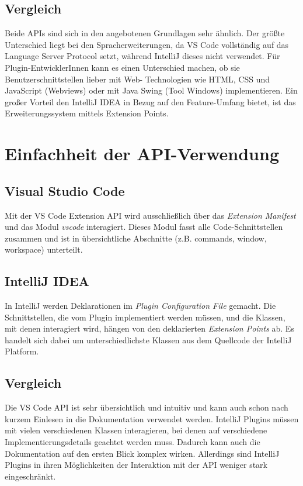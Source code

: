 \subsection{Vergleich}

Beide APIs sind sich in den angebotenen Grundlagen sehr ähnlich.
Der größte Unterschied liegt bei den Spracherweiterungen, da VS Code 
vollständig auf das Language Server Protocol setzt, während IntelliJ
dieses nicht verwendet. Für Plugin-EntwicklerInnen
kann es einen Unterschied machen, ob sie Benutzerschnittstellen
lieber mit Web-\linebreak 
Technologien wie HTML, CSS und JavaScript (Webviews) oder
mit Java Swing (Tool Windows) implementieren. 
Ein großer Vorteil den IntelliJ IDEA in Bezug auf den Feature-Umfang
bietet, ist das Erweiterungssystem mittels Extension Points.


\section{Einfachheit der API-Verwendung}
\label{sec:Vergleich_Intuitivität}

\subsection{Visual Studio Code}

Mit der VS Code Extension API wird ausschließlich
über das \emph{Extension Manifest} und das Modul \emph{vscode} interagiert.
Dieses Modul fasst alle Code-Schnittstellen zusammen und ist
in übersichtliche Abschnitte (z.B. commands, window, workspace) unterteilt.

\subsection{IntelliJ IDEA}

In IntelliJ werden Deklarationen im \emph{Plugin Configuration File} gemacht.
Die Schnittstellen, die vom Plugin implementiert werden müssen, und
die Klassen, mit denen interagiert wird, hängen von den deklarierten
\emph{Extension Points} ab. Es handelt sich dabei um unterschiedlichste
Klassen aus dem Quellcode der IntelliJ Platform.

\subsection{Vergleich}

Die VS Code API ist sehr übersichtlich und intuitiv und kann auch
schon nach kurzem Einlesen in die Dokumentation verwendet werden.
IntelliJ Plugins müssen mit vielen verschiedenen Klassen interagieren,
bei denen auf verschiedene Implementierungsdetails geachtet werden muss.
Dadurch kann auch die Dokumentation auf den ersten Blick komplex
wirken. Allerdings sind IntelliJ Plugins in ihren Möglichkeiten der
Interaktion mit der API weniger stark eingeschränkt.


